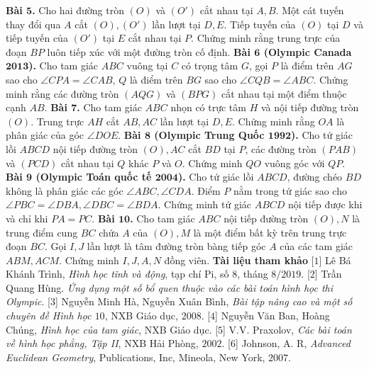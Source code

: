 \begin{multicols}{2}
	\vskip 0.1cm
	\textbf{\color{diendantoanhoc}Bài $\pmb{5}$.} Cho hai đường tròn $(O)$ và $(O')$ cắt nhau  tại $A,B$. Một cát tuyến thay đổi qua $A$ cắt $(O),(O')$ lần lượt tại $D,E$. Tiếp tuyến của $(O)$ tại $D$ và tiếp tuyến của $(O')$ tại $E$ cắt nhau tại $P$. Chứng minh rằng trung trực của đoạn $BP$ luôn tiếp xúc với một đường tròn cố định.
	\vskip 0.1cm
	\textbf{\color{diendantoanhoc}Bài $\pmb{6}$ (Olympic Canada $\pmb{2013}$).} Cho tam giác $ABC$ vuông tại $C$ có trọng tâm $G$, gọi $P$ là điểm trên $AG$ sao cho  $\angle CPA = \angle CAB$, $Q$ là điểm trên $BG$ sao cho  $\angle CQB = \angle ABC$. Chứng minh rằng các đường tròn $(AQG)$ và $(BPG)$ cắt nhau tại một điểm thuộc cạnh $AB$.
	\vskip 0.1cm
	\textbf{\color{diendantoanhoc}Bài $\pmb{7}$.} Cho tam giác $ABC$ nhọn có trực tâm $H$ và nội tiếp đường tròn $(O)$. Trung trực $AH$ cắt $AB,AC$ lần lượt tại $D,E$. Chứng minh rằng $OA$ là phân giác của góc  $\angle DOE$.
	\vskip 0.1cm
	\textbf{\color{diendantoanhoc}Bài $\pmb{8}$ (Olympic Trung Quốc $\pmb{1992}$).} Cho tứ giác lồi $ABCD$ nội tiếp đường tròn $(O),AC$ cắt $BD$ tại $P$, các đường tròn $(PAB)$ và $(PCD)$ cắt nhau tại $Q$ khác $P$ và $O$. Chứng minh $QO$ vuông góc với $QP$.
	\vskip 0.1cm
	\textbf{\color{diendantoanhoc}Bài $\pmb{9}$ (Olympic Toán quốc tế $\pmb{2004}$).} Cho tứ giác lồi $ABCD$, đường chéo $BD$ không là phân giác các góc  $\angle ABC, \angle CDA$. Điểm $P$ nằm trong tứ giác sao cho  $\angle PBC = \angle DBA, \angle DBC = \angle BDA$. Chứng minh tứ giác $ABCD$ nội tiếp được khi và chỉ khi $PA=PC$.
	\vskip 0.1cm
	\textbf{\color{diendantoanhoc}Bài $\pmb{10}$.} Cho tam giác $ABC$ nội tiếp đường tròn $(O),N$ là trung điểm cung $BC$ chứa $A$ của $(O), M$ là một điểm bất kỳ trên trung trực đoạn $BC$. Gọi $I,J$ lần lượt là tâm đường tròn bàng tiếp góc $A$ của các tam giác $ABM,ACM$. Chứng minh $I,J,A,N$ đồng viên.
	\vskip 0.1cm
	\textbf{\color{diendantoanhoc}Tài liệu tham khảo}
	\vskip 0.1cm
	[$1$] Lê Bá Khánh Trình, \textit{Hình học tĩnh và động}, tạp chí Pi, số $8$, tháng $8/2019$. 
	\vskip 0.1cm
	[$2$] Trần Quang Hùng. \textit{Ứng dụng một số bổ quen thuộc vào các bài toán hình học thi Olympic}.
	\vskip 0.1cm
	[$3$] Nguyễn Minh Hà, Nguyễn Xuân Bình, \textit{Bài tập nâng cao và một số chuyên đề Hình học $10$}, NXB Giáo dục, $2008$.
	\vskip 0.1cm
	[$4$] Nguyễn Văn Ban, Hoàng Chúng, \textit{Hình học của tam giác}, NXB Giáo dục.
	\vskip 0.1cm
	[$5$] V.V. Praxolov, \textit{Các bài toán về hình học phẳng, Tập II}, NXB Hải Phòng, $2002$.
	\vskip 0.1cm
	[$6$] Johnson, A. R, \textit{Advanced Euclidean Geometry}, Publications, Inc, Mineola, New York, $2007$.
\end{multicols}
